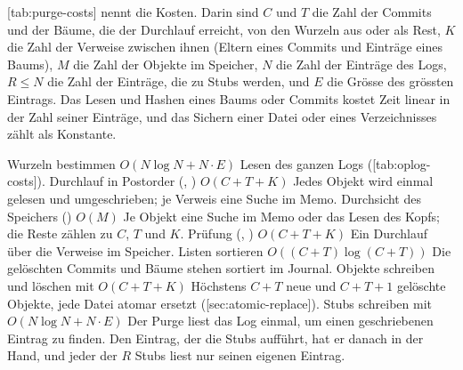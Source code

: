 {[tab:purge-costs] nennt die Kosten.
Darin sind $C$ und $T$ die Zahl der Commits und der Bäume, die der Durchlauf erreicht,
von den Wurzeln aus oder als Rest,
$K$ die Zahl der Verweise zwischen ihnen (Eltern eines Commits und Einträge eines Baums),
$M$ die Zahl der Objekte im Speicher,
$N$ die Zahl der Einträge des Logs, $R \le N$ die Zahl der Einträge, die zu Stubs werden,
und $E$ die Grösse des grössten Eintrags.
Das Lesen und Hashen eines Baums oder Commits kostet Zeit linear in der Zahl seiner Einträge,
und das Sichern einer Datei oder eines Verzeichnisses zählt als Konstante.

\startplacetable[title={Kosten eines Purge},reference=tab:purge-costs,location=here]
\startxtable[frame=off,option=stretch]
\startxrow[topframe=on,bottomframe=on]
 \stopxcell
{} \stopxcell
{} \stopxcell
\stopxrow
\startxrow
\startxcell Wurzeln bestimmen \stopxcell
\startxcell $O(N \log N + N \cdot E)$ \stopxcell
\startxcell Lesen des ganzen Logs ([tab:oplog-costs]). \stopxcell
\stopxrow
\startxrow
\startxcell Durchlauf in Postorder (, ) \stopxcell
\startxcell $O(C + T + K)$ \stopxcell
\startxcell Jedes Objekt wird einmal gelesen und umgeschrieben;
je Verweis eine Suche im Memo. \stopxcell
\stopxrow
\startxrow
\startxcell Durchsicht des Speichers () \stopxcell
\startxcell $O(M)$ \stopxcell
\startxcell Je Objekt eine Suche im Memo oder das Lesen des Kopfs;
die Reste zählen zu $C$, $T$ und $K$. \stopxcell
\stopxrow
\startxrow
\startxcell Prüfung (, ) \stopxcell
\startxcell $O(C + T + K)$ \stopxcell
\startxcell Ein Durchlauf über die Verweise im Speicher. \stopxcell
\stopxrow
\startxrow
\startxcell Listen sortieren \stopxcell
\startxcell $O((C + T) \log (C + T))$ \stopxcell
\startxcell Die gelöschten Commits und Bäume stehen sortiert im Journal. \stopxcell
\stopxrow
\startxrow
\startxcell Objekte schreiben und löschen mit  \stopxcell
\startxcell $O(C + T + K)$ \stopxcell
\startxcell Höchstens $C + T$ neue und $C + T + 1$ gelöschte Objekte,
jede Datei atomar ersetzt ([sec:atomic-replace]). \stopxcell
\stopxrow
\startxrow[bottomframe=on]
\startxcell Stubs schreiben mit  \stopxcell
\startxcell $O(N \log N + N \cdot E)$ \stopxcell
\startxcell Der Purge liest das Log einmal, um einen geschriebenen Eintrag  zu finden.
Den Eintrag, der die Stubs aufführt, hat er danach in der Hand,
und jeder der $R$ Stubs liest nur seinen eigenen Eintrag. \stopxcell
\stopxrow
\stopxtable
\stopplacetable

}
